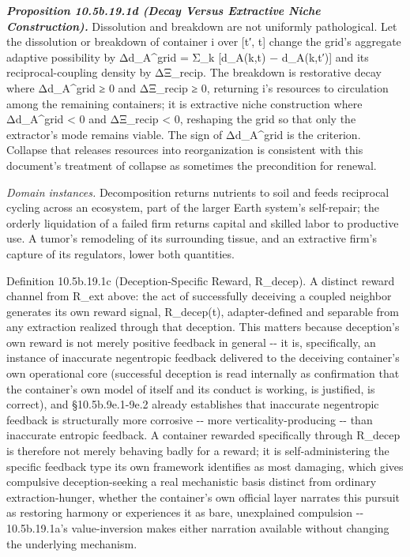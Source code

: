 \documentclass[
]{article}
\begin{document}
\emph{\textbf{Proposition 10.5b.19.1d (Decay Versus Extractive Niche
Construction).}} Dissolution and breakdown are not uniformly
pathological. Let the dissolution or breakdown of container i over
{[}t′, t{]} change the grid's aggregate adaptive possibility by
Δd\_A\^{}grid = Σ\_k {[}d\_A(k,t) − d\_A(k,t′){]} and its
reciprocal-coupling density by ΔΞ\_recip. The breakdown is restorative
decay where Δd\_A\^{}grid ≥ 0 and ΔΞ\_recip ≥ 0, returning i's resources
to circulation among the remaining containers; it is extractive niche
construction where Δd\_A\^{}grid \textless{} 0 and ΔΞ\_recip \textless{}
0, reshaping the grid so that only the extractor's mode remains viable.
The sign of Δd\_A\^{}grid is the criterion. Collapse that releases
resources into reorganization is consistent with this document's
treatment of collapse as sometimes the precondition for renewal.

\emph{Domain instances.} Decomposition returns nutrients to soil and
feeds reciprocal cycling across an ecosystem, part of the larger Earth
system's self-repair; the orderly liquidation of a failed firm returns
capital and skilled labor to productive use. A tumor's remodeling of its
surrounding tissue, and an extractive firm's capture of its regulators,
lower both quantities.

Definition 10.5b.19.1c (Deception-Specific Reward, R\_decep). A distinct
reward channel from R\_ext above: the act of successfully deceiving a
coupled neighbor generates its own reward signal, R\_decep(t),
adapter-defined and separable from any extraction realized through that
deception. This matters because deception's own reward is not merely
positive feedback in general -\/- it is, specifically, an instance of
inaccurate negentropic feedback delivered to the deceiving container's
own operational core (successful deception is read internally as
confirmation that the container's own model of itself and its conduct is
working, is justified, is correct), and §10.5b.9e.1-9e.2 already
establishes that inaccurate negentropic feedback is structurally more
corrosive -\/- more verticality-producing -\/- than inaccurate entropic
feedback. A container rewarded specifically through R\_decep is
therefore not merely behaving badly for a reward; it is
self-administering the specific feedback type its own framework
identifies as most damaging, which gives compulsive deception-seeking a
real mechanistic basis distinct from ordinary extraction-hunger, whether
the container's own official layer narrates this pursuit as restoring
harmony or experiences it as bare, unexplained compulsion -\/-
10.5b.19.1a's value-inversion makes either narration available without
changing the underlying mechanism.
\end{document}
